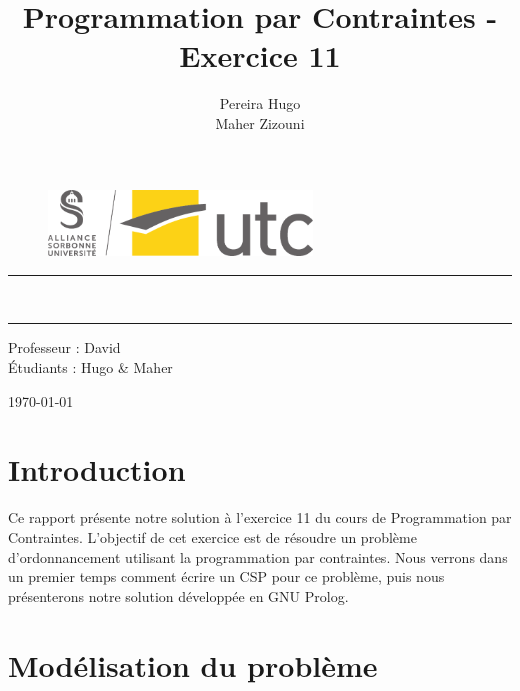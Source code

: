 \documentclass{latexPackage/utc-report/utc-report}
\title{Programmation par Contraintes - Exercice 11}
\author{{\sc Pereira} Hugo \\ {\sc Maher} Zizouni}
\begin{document}
\thispagestyle{empty}
\setcounter{page}{0}

\begin{figure}[H]
\centering
\includegraphics[width=7cm]{latexPackage/utc-report/utc-graphics/logos/UTC/logo_UTC.pdf}
\end{figure}

\vspace{2cm}

\begin{center}

{\color{jauneUTC}\rule{\linewidth}{0.8mm}}
\vspace*{0mm}

\Huge{\textbf{\theUV \\ \thetitle}}
{\color{jauneUTC}\rule{\linewidth}{0.8mm}}

\vspace{2cm}

\Large{
    Professeur :  David \\
    Étudiants :  Hugo \&  Maher
} \\

\vspace{2cm}

\today

\end{center}

\pagebreak

\tableofcontents{}

\pagebreak

\section{Introduction}

Ce rapport présente notre solution à l'exercice 11 du cours de Programmation par Contraintes. L'objectif de cet exercice est de résoudre un problème d'ordonnancement utilisant la programmation par contraintes. Nous verrons dans un premier temps comment écrire un CSP pour ce problème, puis nous présenterons notre solution développée en GNU Prolog.

\section{Modélisation du problème}
\end{document}
